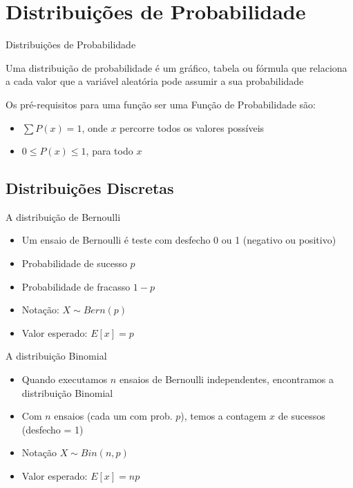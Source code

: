 \documentclass{beamer}
\begin{document}

\section{Distribuições de Probabilidade}
\begin{frame}{Distribuições de Probabilidade}
  \begin{definition}
    Uma \alert{distribuição de probabilidade} é um gráfico, tabela ou
    fórmula que relaciona a cada valor que a variável aleatória pode
    assumir a sua probabilidade
  \end{definition}
  Os pré-requisitos para uma função ser uma Função de Probabilidade
  são:
  \begin{itemize}
  \item $\sum P(x) = 1$, onde $x$ percorre todos os valores possíveis
  \item $0 \le P(x) \le 1$, para todo $x$
  \end{itemize}
\end{frame}

\subsection{Distribuições Discretas}

\begin{frame}{A distribuição de Bernoulli}
  \begin{itemize}
  \item Um ensaio de Bernoulli é teste com desfecho 0 ou 1 (negativo
    ou positivo)
  \item Probabilidade de sucesso $p$
  \item Probabilidade de fracasso $1-p$
  \item Notação: $X \sim Bern(p)$
  \item Valor esperado: $E[x] = p$
  \end{itemize}
\end{frame}

\begin{frame}{A distribuição Binomial}
  \begin{itemize}
  \item Quando executamos $n$ ensaios de Bernoulli
    \alert{independentes}, encontramos a distribuição Binomial
  \item Com $n$ ensaios (cada um com prob. $p$), temos a contagem $x$
    de sucessos (desfecho = 1)
  \item Notação $X \sim Bin(n,p)$
  \item Valor esperado: $E[x]=np$
  \end{itemize}
\end{frame}
\end{document}
